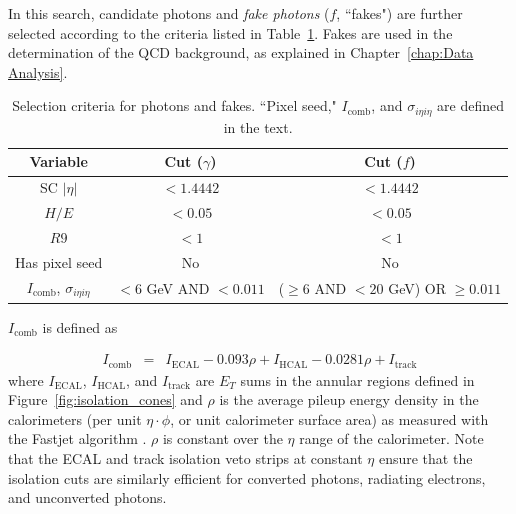 \documentclass[dissertation.tex]{subfiles}
\begin{document}
In this search, candidate photons and \textit{fake photons} ($\mathit{f}$, ``fakes") are further selected according to the criteria listed in Table~\ref{tab:g_f_criteria}.  Fakes are used in the determination of the QCD background, as explained in Chapter~\ref{chap:Data Analysis}.

\begin{table}[hcbp]
\caption{Selection criteria for photons and fakes.  ``Pixel seed," $I_{\mathrm{comb}}$, and $\sigma_{i\eta i\eta}$ are defined in the text.}
\centering
\begin{tabular}{|c|c|c|}
\hline
Variable & Cut ($\gamma$) & Cut ($\mathit{f}$) \\
\hline
\hline
SC $|\eta|$ & $< 1.4442$ & $<1.4442$ \\
\hline
$H/E$ & $<0.05$ & $<0.05$ \\
\hline
$R9$ & $< 1$ & $< 1$ \\
\hline
Has pixel seed & No & No \\
\hline
$I_{\mathrm{comb}}$, $\sigma_{i\eta i\eta}$ & $< 6$ GeV AND $< 0.011$ & ($\geq 6$ AND $< 20$ GeV) OR $\geq 0.011$ \\
\hline
\end{tabular}
\label{tab:g_f_criteria}
\end{table}

$I_{\mathrm{comb}}$ is defined as

\begin{eqnarray}
I_{\mathrm{comb}} &=& I_{\mathrm{ECAL}} - 0.093\rho + I_{\mathrm{HCAL}} - 0.0281\rho + I_{\mathrm{track}}
\end{eqnarray}
%
where $I_{\mathrm{ECAL}}$, $I_{\mathrm{HCAL}}$, and $I_{\mathrm{track}}$ are $E_{T}$ sums in the annular regions defined in Figure~\ref{fig:isolation_cones} and $\rho$ is the average pileup energy density in the calorimeters (per unit $\eta\cdot\phi$, or unit calorimeter surface area) as measured with the Fastjet algorithm \cite{Fastjet_conf_proceedings, Fastjet_manual}.  $\rho$ is constant over the $\eta$ range of the calorimeter.  Note that the ECAL and track isolation veto strips at constant $\eta$ ensure that the isolation cuts are similarly efficient for converted photons, radiating electrons, and unconverted photons.
\end{document}

